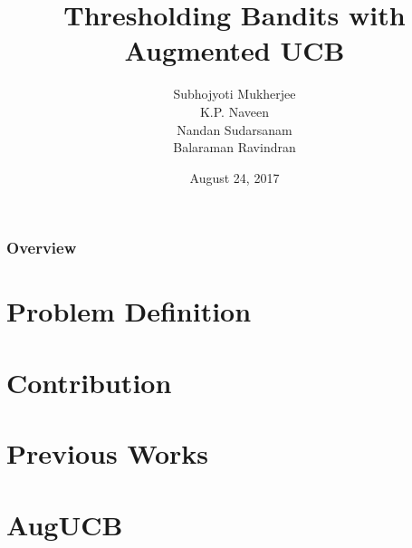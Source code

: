 \documentclass{beamer}
\title[Thresholding Bandits with Augmented UCB]{Thresholding Bandits with Augmented UCB} %
\author{Subhojyoti Mukherjee\\ K.P. Naveen \\ Nandan Sudarsanam \\ Balaraman Ravindran } %
\institute[IIT Madras] %
{
IIT Madras \\ %
\medskip
}
\date{August 24, 2017}
\begin{document}
\nocite{*}
\begin{frame}
\titlepage %
\end{frame}

\begin{frame}
\frametitle{Overview} %
\tableofcontents %
\end{frame}



%

%

\section{Problem Definition}


\section{Contribution}


\section{Previous Works}


\section{AugUCB}

\end{document}
